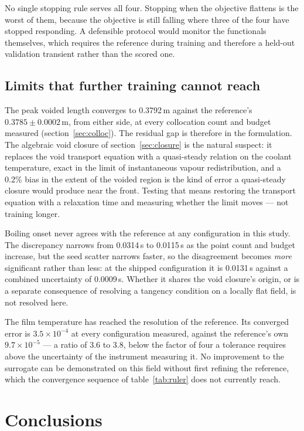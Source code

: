 \documentclass[11pt,a4paper]{article}
\begin{document}
No single stopping rule serves all four. Stopping when the objective flattens is the worst
of them, because the objective is still falling where three of the four have stopped
responding. A defensible protocol would monitor the functionals themselves, which requires
the reference during training and therefore a held-out validation transient rather than the
scored one.

\subsection{Limits that further training cannot reach}

The peak voided length converges to 0.3792\,m against the reference's
$0.3785 \pm 0.0002$\,m, from either side, at every collocation count and budget measured
(section~\ref{sec:colloc}). The residual gap is therefore in the formulation. The algebraic
void closure of section~\ref{sec:closure} is the natural suspect: it replaces the void
transport equation with a quasi-steady relation on the coolant temperature, exact in the
limit of instantaneous vapour redistribution, and a 0.2\% bias in the extent of the voided
region is the kind of error a quasi-steady closure would produce near the front. Testing
that means restoring the transport equation with a relaxation time and measuring whether the
limit moves --- not training longer.

Boiling onset never agrees with the reference at any configuration in this study. The
discrepancy narrows from 0.0314\,s to 0.0115\,s as the point count and budget increase, but
the seed scatter narrows faster, so the disagreement becomes \emph{more} significant rather
than less: at the shipped configuration it is 0.0131\,s against a combined uncertainty of
0.0009\,s. Whether it shares the void closure's origin, or is a separate consequence of
resolving a tangency condition on a locally flat field, is not resolved here.

The film temperature has reached the resolution of the reference. Its converged error is
$3.5\times10^{-4}$ at every configuration measured, against the reference's own
$9.7\times10^{-5}$ --- a ratio of 3.6 to 3.8, below the factor of four a tolerance requires
above the uncertainty of the instrument measuring it. No improvement to the surrogate can be
demonstrated on this field without first refining the reference, which the convergence
sequence of table~\ref{tab:ruler} does not currently reach.

\section{Conclusions}
\end{document}
